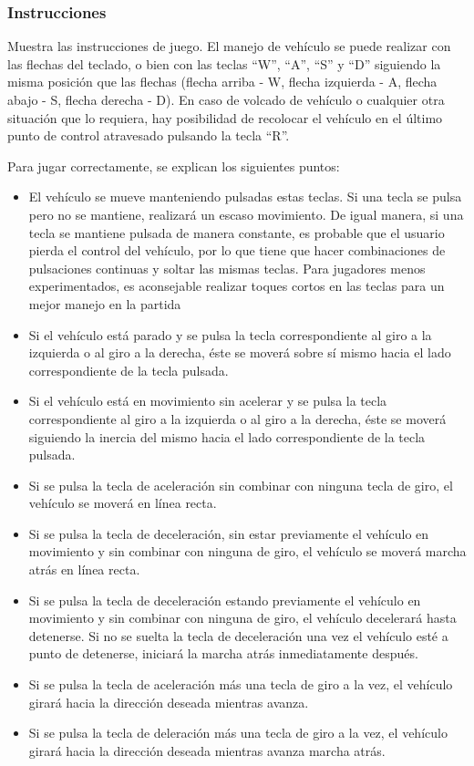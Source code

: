 
\subsubsection{Instrucciones}

Muestra las instrucciones de juego. El manejo de vehículo se puede realizar con las flechas del teclado, o bien con las teclas ``W'', ``A'', ``S'' y ``D'' siguiendo la misma posición que las flechas (flecha arriba - W, flecha izquierda - A, flecha abajo - S, flecha derecha - D). En caso de volcado de vehículo o cualquier otra situación que lo requiera, hay posibilidad de recolocar el vehículo en el último punto de control atravesado pulsando la tecla ``R''.


Para jugar correctamente, se explican los siguientes puntos:

\begin{itemize}
\tightlist
	\item El vehículo se mueve manteniendo pulsadas estas teclas. Si una tecla se pulsa pero no se mantiene, realizará un escaso movimiento. De igual manera, si una tecla se mantiene pulsada de manera constante, es probable que el usuario pierda el control del vehículo, por lo que tiene que hacer combinaciones de pulsaciones continuas y soltar las mismas teclas. Para jugadores menos experimentados, es aconsejable realizar toques cortos en las teclas para un mejor manejo en la partida
	\item Si el vehículo está parado y se pulsa la tecla correspondiente al giro a la izquierda o al giro a la derecha, éste se moverá sobre sí mismo hacia el lado correspondiente de la tecla pulsada.
	\item Si el vehículo está en movimiento sin acelerar y se pulsa la tecla correspondiente al giro a la izquierda o al giro a la derecha, éste se moverá siguiendo la inercia del mismo hacia el lado correspondiente de la tecla pulsada.
	\item Si se pulsa la tecla de aceleración sin combinar con ninguna tecla de giro, el vehículo se moverá en línea recta.
	\item Si se pulsa la tecla de deceleración, sin estar previamente el vehículo en movimiento y sin combinar con ninguna de giro, el vehículo se moverá marcha atrás en línea recta.
	\item Si se pulsa la tecla de deceleración estando previamente el vehículo en movimiento y sin combinar con ninguna de giro, el vehículo decelerará hasta detenerse. Si no se suelta la tecla de deceleración una vez el vehículo esté a punto de detenerse, iniciará la marcha atrás inmediatamente después.
	\item Si se pulsa la tecla de aceleración más una tecla de giro a la vez, el vehículo girará hacia la dirección deseada mientras avanza.
	\item Si se pulsa la tecla de deleración más una tecla de giro a la vez, el vehículo girará hacia la dirección deseada mientras avanza marcha atrás.
\end{itemize}


